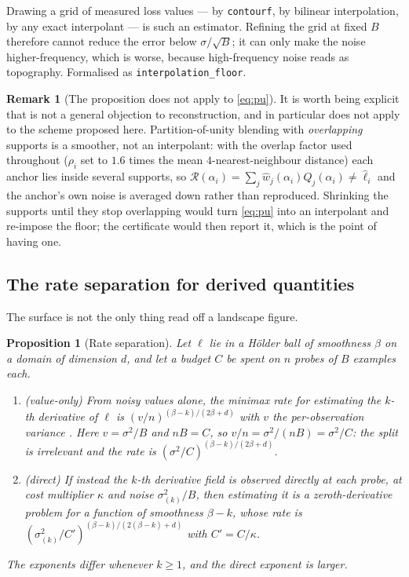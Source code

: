 \documentclass[11pt]{article}
\newtheorem{proposition}[theorem]{Proposition}
\theoremstyle{definition}
\newtheorem{remark}[theorem]{Remark}
\newcommand{\Rec}{\mathcal{R}}
\newcommand{\lean}[1]{\texttt{#1}}
\begin{document}
Drawing a grid of measured loss values --- by \texttt{contourf}, by bilinear
interpolation, by any exact interpolant --- is such an estimator. Refining the grid at
fixed $B$ therefore cannot reduce the error below $\sigma/\sqrt{B}$; it can only make
the noise higher-frequency, which is worse, because high-frequency noise reads as
topography. Formalised as \lean{interpolation\_floor}.

\begin{remark}[The proposition does not apply to \eqref{eq:pu}]
It is worth being explicit that  is not a general objection to
reconstruction, and in particular does not apply to the scheme proposed here.
Partition-of-unity blending with \emph{overlapping} supports is a smoother, not an
interpolant: with the overlap factor used throughout ($\rho_i$ set to $1.6$ times the
mean $4$-nearest-neighbour distance) each anchor lies inside several supports, so
$\Rec(\alpha_i)=\sum_j \hat w_j(\alpha_i)Q_j(\alpha_i)\neq\hat\ell_i$ and the anchor's
own noise is averaged down rather than reproduced. Shrinking the supports until they
stop overlapping would turn \eqref{eq:pu} into an interpolant and re-impose the floor;
the certificate would then report it, which is the point of having one.
\end{remark}

\subsection{The rate separation for derived quantities}

The surface is not the only thing read off a landscape figure.

\begin{proposition}[Rate separation]
\label{prop:sep}
Let $\ell$ lie in a H\"older ball of smoothness $\beta$ on a domain of dimension $d$,
and let a budget $C$ be spent on $n$ probes of $B$ examples each.
\begin{enumerate}[leftmargin=1.6em,itemsep=1pt]
\item \emph{(value-only)} From noisy values alone, the minimax rate for estimating the
$k$-th derivative of $\ell$ is $(v/n)^{(\beta-k)/(2\beta+d)}$ with $v$ the per-observation
variance \citep{stone1980optimal}. Here $v=\sigma^2/B$ and $nB=C$, so
$v/n = \sigma^2/(nB) = \sigma^2/C$: \emph{the split is irrelevant} and the rate is
$(\sigma^2/C)^{(\beta-k)/(2\beta+d)}$.
\item \emph{(direct)} If instead the $k$-th derivative field is observed directly at
each probe, at cost multiplier $\kappa$ and noise $\sigma_{(k)}^2/B$, then estimating it
is a \emph{zeroth}-derivative problem for a function of smoothness $\beta-k$, whose rate
is $(\sigma_{(k)}^2/C')^{(\beta-k)/(2(\beta-k)+d)}$ with $C'=C/\kappa$.
\end{enumerate}
The exponents differ whenever $k\ge1$, and the direct exponent is larger.
\end{proposition}
\end{document}
